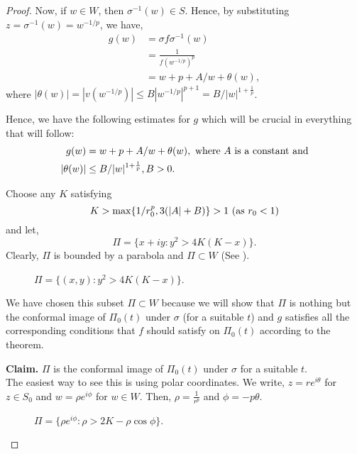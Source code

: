 \begin{proof}
	Now, if \( w\in W \), then \( \sigma^{-1}(w)\in S \). Hence, by substituting \( z=\sigma^{-1}(w)=w^{-1/p} \), we have,
	\begin{align*}
		g(w)&=\sigma f\sigma^{-1}(w)\\
			&=\frac{1}{f(w^{-1/p})^{p}}\\
			&=w+p+A /w+\theta(w)
		,\end{align*} where \( |\theta (w)|=|v(w^{-1/p})|\le B|w^{-1/p}|^{p+1}=B /|w|^{1+\frac{1}{p}} \).

	\noindent Hence, we have the following estimates 
	for \( g \) which will be crucial in everything that will follow:
	\begin{align}
		g(w)&=w+p+A /w+\theta (w),\text{ where \( A \) is a constant and} \label{eqn3.1}\\
		|\theta (w)|&\le B /|w|^{1+\frac{1}{p}}, B>0 \label{eqn3.2}
	.\end{align}

	\noindent Choose any \( K \) satisfying \[
	K>\max\{ 1 /r_0^p,3(|A|+B) \}>1 \text{ (as \( r_0<1 \))}
	\]  and let, \[
		\Pi=\{x+iy:y^2>4K(K-x)\}
	.\] Clearly, \( \Pi \) is bounded by a parabola and \( \Pi\subset W \) (See ).
\begin{figure}[ht]
    \centering
	\caption{$\Pi=\{(x,y):y^2>4K(K-x)\}$.}
    \label{parabola}
\end{figure}

	We have chosen this subset \( \Pi\subset W \) because we will show that \( \Pi \)
	is nothing but the conformal image of \( \Pi_0(t) \) under \( \sigma \) (for a suitable \( t \)) and
	\( g \) satisfies all the corresponding conditions that \( f \) should satisfy on \( \Pi_0(t) \) according to the
	theorem.\\
	\vspace{1pt}

	\noindent \textbf{Claim.} \( \Pi \) is the conformal image of \( \Pi_0(t) \) under \( \sigma \) for a suitable \( t \).\\
	The easiest way to see this is using polar coordinates. We write, \( z=re^{i\theta } \) for \( z\in S_0 \) 
	and \( w=\rho e^{i \phi } \) for \( w\in W \). Then, \( \rho=\frac{1}{r^p} \) and \( \phi=-p\theta  \).

	\begin{figure}[ht]
		\centering
		\caption{$\Pi=\{\rho e^{i\phi}:\rho>2K-\rho\cos\phi\}$.}
		\label{parabola2}
	\end{figure}
	

\end{proof}
